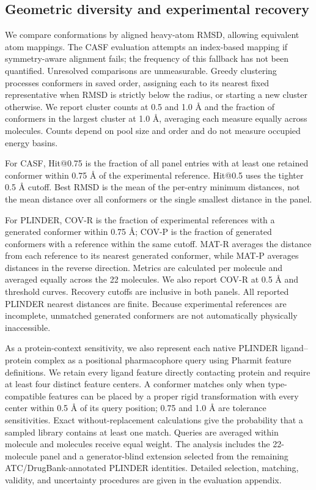 \subsection{Geometric diversity and experimental recovery}

We compare conformations by aligned heavy-atom RMSD, allowing equivalent atom mappings.
The CASF evaluation attempts an index-based mapping if symmetry-aware alignment
fails; the frequency of this fallback has not been quantified. Unresolved comparisons
are unmeasurable.
Greedy clustering processes conformers in saved order, assigning each to its nearest
fixed representative when RMSD is strictly below the radius, or starting a new cluster
otherwise. We report cluster counts at 0.5 and 1.0 \AA{} and the fraction of conformers
in the largest cluster at 1.0 \AA{}, averaging each measure equally across molecules.
Counts depend on pool size and order and do not measure occupied energy basins.

For CASF, Hit@0.75 is the fraction of all panel entries with at least one retained
conformer within 0.75 \AA{} of the experimental reference. Hit@0.5 uses the tighter
0.5 \AA{} cutoff. Best RMSD is the mean of the per-entry minimum distances, not the
mean distance over all conformers or the single smallest distance in the panel.

For PLINDER, COV-R is the fraction of experimental references with a generated
conformer within 0.75 \AA{}; COV-P is the fraction of generated conformers with a
reference within the same cutoff. MAT-R averages the distance from each reference
to its nearest generated conformer, while MAT-P averages distances in the reverse
direction. Metrics are calculated per molecule and averaged equally across the 22
molecules. We also report COV-R at 0.5 \AA{} and threshold curves. Recovery cutoffs
are inclusive in both panels. All reported PLINDER nearest distances are finite.
Because experimental references are incomplete, unmatched generated conformers are
not automatically physically inaccessible.

As a protein-context sensitivity, we also represent each native PLINDER
ligand--protein complex as a positional pharmacophore query using Pharmit feature
definitions.\cite{sunseri2016pharmit} We retain every ligand feature directly
contacting protein and require at least four distinct feature centers. A conformer
matches only when type-compatible features can be placed by a proper rigid
transformation with every center within 0.5 \AA{} of its query position; 0.75 and
1.0 \AA{} are tolerance sensitivities. Exact without-replacement calculations give
the probability that a sampled library contains at least one match. Queries are
averaged within molecule and molecules receive equal weight. The analysis includes
the 22-molecule panel and a generator-blind extension selected from the remaining
ATC/DrugBank-annotated PLINDER identities. Detailed selection, matching, validity,
and uncertainty procedures are given in the evaluation appendix.

